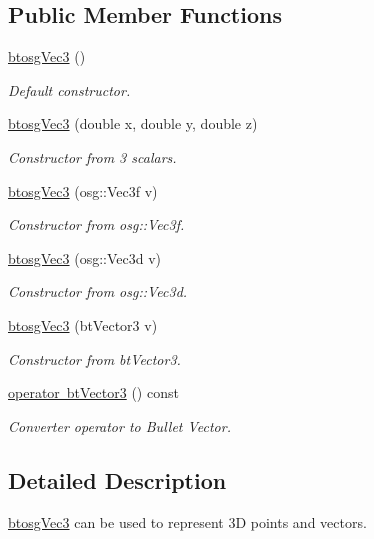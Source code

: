\subsection*{Public Member Functions}
\begin{DoxyCompactItemize}
\item 
\mbox{\hyperlink{classbtosgVec3_a3acd9fe06eeea6dfdec4f7dd6a22abc2}{btosg\+Vec3}} ()
\begin{DoxyCompactList}\small\item\em Default constructor. \end{DoxyCompactList}\item 
\mbox{\hyperlink{classbtosgVec3_a8bebd055644195494a10937ca754f55b}{btosg\+Vec3}} (double x, double y, double z)
\begin{DoxyCompactList}\small\item\em Constructor from 3 scalars. \end{DoxyCompactList}\item 
\mbox{\hyperlink{classbtosgVec3_a029392a1bc72f7031b8ca99aa814e2a1}{btosg\+Vec3}} (osg\+::\+Vec3f v)
\begin{DoxyCompactList}\small\item\em Constructor from osg\+::\+Vec3f. \end{DoxyCompactList}\item 
\mbox{\hyperlink{classbtosgVec3_a34c56d6b0bb27fffa5f4089d7a81b320}{btosg\+Vec3}} (osg\+::\+Vec3d v)
\begin{DoxyCompactList}\small\item\em Constructor from osg\+::\+Vec3d. \end{DoxyCompactList}\item 
\mbox{\hyperlink{classbtosgVec3_a2c7014fd9cd67b1918fdf2f53e0d1372}{btosg\+Vec3}} (bt\+Vector3 v)
\begin{DoxyCompactList}\small\item\em Constructor from bt\+Vector3. \end{DoxyCompactList}\item 
\mbox{\hyperlink{classbtosgVec3_a8e9e5bea1a46ba76e213a3f6e5e14dba}{operator bt\+Vector3}} () const
\begin{DoxyCompactList}\small\item\em Converter operator to Bullet Vector. \end{DoxyCompactList}\end{DoxyCompactItemize}


\subsection{Detailed Description}
\mbox{\hyperlink{classbtosgVec3}{btosg\+Vec3}} can be used to represent 3D points and vectors. 

